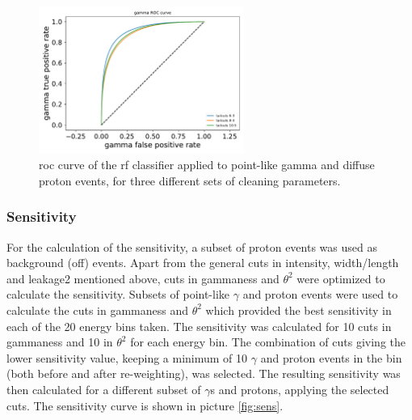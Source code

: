 \documentclass[main.tex]{subfiles}
\begin{document}
\begin{figure}[h]
  \centering
  \includegraphics[width=0.6\textwidth]{Pictures/ROC.pdf}
  \caption{\gls{roc} curve of the \gls{rf} classifier applied to point-like gamma and diffuse proton events, for three different sets of cleaning parameters.}
  \label{fig:roc}
\end{figure}


\subsubsection{Sensitivity}

For the calculation of the sensitivity, a subset of proton events was used as background (off) events. Apart from the general cuts in intensity, width/length and leakage2 mentioned above, cuts in gammaness and $\theta^2$ were optimized to calculate the sensitivity. Subsets of point-like $\gamma$  and proton events were used to calculate the cuts in gammaness and $\theta^2$ which provided the best sensitivity in each of the 20 energy bins taken. The sensitivity was calculated for 10 cuts in gammaness and  10 in $\theta^2$ for each energy bin. The combination of cuts giving the lower sensitivity value, keeping a minimum of 10 $\gamma$ and proton events in the bin (both before and after re-weighting), was selected.
The resulting sensitivity was then calculated for a different subset of $\gamma$s and protons, applying the selected cuts. The sensitivity curve is shown in picture \ref{fig:sens}.
\end{document}
